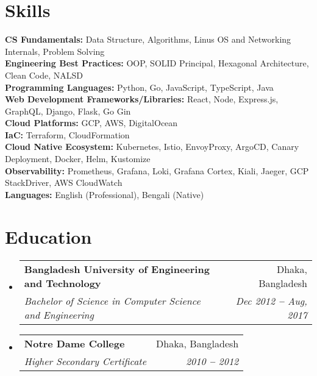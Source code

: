 \documentclass[letterpaper,11pt]{article}
\makeatletter
\newcommand{\resumeSubheading}[4]{
  \vspace{-2pt}\item
    \begin{tabular*}{0.97\textwidth}[t]{l@{\extracolsep{\fill}}r}
      \textbf{#1} & #2 \\
      \textit{\small#3} & \textit{\small #4} \\
    \end{tabular*}\vspace{-7pt}
}
\newcommand{\resumeSubHeadingListStart}{\begin{itemize}[leftmargin=0.15in, label={}]}
\newcommand{\resumeSubHeadingListEnd}{\end{itemize}}
\makeatother
\begin{document}
\section{Skills}
  \vspace{1pt}
  \resumeSubHeadingListStart
    \small{\item{
        \textbf{CS Fundamentals:}{ Data Structure, Algorithms, Linus OS and Networking Internals, Problem Solving} \\ \vspace{2pt}
        \textbf{Engineering Best Practices: }{OOP, SOLID Principal, Hexagonal Architecture, Clean Code, NALSD} \\ \vspace{2pt}
        \textbf{Programming Languages: }{Python, Go, JavaScript, TypeScript, Java} \\ \vspace{2pt}
        \textbf{Web Development Frameworks/Libraries: }{React, Node, Express.js, GraphQL, Django, Flask, Go Gin} \\ \vspace{2pt}
        \textbf{Cloud Platforms: }{GCP, AWS, DigitalOcean} \\ \vspace{2pt}
        \textbf{IaC: }{Terraform, CloudFormation} \\ \vspace{2pt}
        \textbf{Cloud Native Ecosystem: }{Kubernetes, Istio, EnvoyProxy, ArgoCD, Canary Deployment, Docker, Helm, Kustomize} \\ \vspace{2pt}
        \textbf{Observability: }{Prometheus, Grafana, Loki, Grafana Cortex, Kiali, Jaeger, GCP StackDriver, AWS CloudWatch} \\ \vspace{2pt}
        \textbf{Languages: }{English (Professional), Bengali (Native)}
    }}
  \resumeSubHeadingListEnd



\section{Education}
  \vspace{3pt}
  \resumeSubHeadingListStart
    
    \resumeSubheading
      {Bangladesh University of Engineering and Technology}{Dhaka, Bangladesh}
      {Bachelor of Science in Computer Science and Engineering}{Dec 2012 \textbf{--} Aug, 2017}
      \vspace{5pt}
    \resumeSubheading
      {Notre Dame College}{Dhaka, Bangladesh}
      {Higher Secondary Certificate}{2010 \textbf{--} 2012}
  \resumeSubHeadingListEnd
\end{document}
